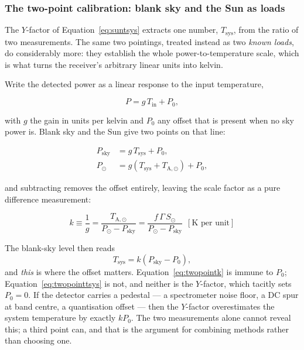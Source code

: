 \documentclass[11pt,a4paper]{article}
\begin{document}
\subsubsection{The two-point calibration: blank sky and the Sun as loads}
\label{sec:twopoint}

The $Y$-factor of Equation~\eqref{eq:suntsys} extracts one number, $T_\text{sys}$, from the ratio of two measurements. The same two pointings, treated instead as two \emph{known loads}, do considerably more: they establish the whole power-to-temperature scale, which is what turns the receiver's arbitrary linear units into kelvin.

Write the detected power as a linear response to the input temperature,

\begin{equation}
P = g\,T_\text{in} + P_0,
\label{eq:linear}
\end{equation}

with $g$ the gain in units per kelvin and $P_0$ any offset that is present when no sky power is. Blank sky and the Sun give two points on that line:

\begin{align}
P_\text{sky} &= g\,T_\text{sys} + P_0, \\
P_\odot &= g\left(T_\text{sys} + T_{\text{A},\odot}\right) + P_0,
\end{align}

and subtracting removes the offset entirely, leaving the scale factor as a pure difference measurement:

\begin{equation}
\boxed{\ k \equiv \frac{1}{g} = \frac{T_{\text{A},\odot}}{P_\odot - P_\text{sky}}
= \frac{f\,\Gamma\,S_\odot}{P_\odot - P_\text{sky}}
\ \ \left[\text{K per unit}\right]\ }
\label{eq:twopointk}
\end{equation}

The blank-sky level then reads
\begin{equation}
T_\text{sys} = k\left(P_\text{sky} - P_0\right),
\label{eq:twopointtsys}
\end{equation}
and \emph{this} is where the offset matters. Equation~\eqref{eq:twopointk} is immune to $P_0$; Equation~\eqref{eq:twopointtsys} is not, and neither is the $Y$-factor, which tacitly sets $P_0 = 0$. If the detector carries a pedestal --- a spectrometer noise floor, a DC spur at band centre, a quantisation offset --- then the $Y$-factor overestimates the system temperature by exactly $k P_0$. The two measurements alone cannot reveal this; a third point can, and that is the argument for combining methods rather than choosing one.
\end{document}
